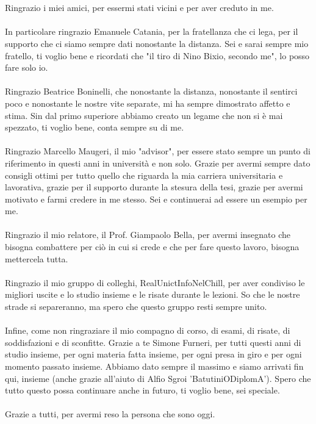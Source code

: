 \\\\Ringrazio i miei amici, per essermi stati vicini e per aver creduto in me.
\\\\In particolare ringrazio Emanuele Catania, per la fratellanza che ci lega, per il supporto che ci siamo sempre dati nonostante la distanza. Sei e sarai sempre mio fratello, ti voglio bene e ricordati che "il tiro di Nino Bixio, secondo me", lo posso fare solo io.
\\\\Ringrazio Beatrice Boninelli, che nonostante la distanza, nonostante il sentirci poco e nonostante le nostre vite separate, mi ha sempre dimostrato affetto e stima. Sin dal primo superiore abbiamo creato un legame che non si è mai spezzato, ti voglio bene, conta sempre su di me.
\\\\Ringrazio Marcello Maugeri, il mio "advisor", per essere stato sempre un punto di riferimento in questi anni in università e non solo. Grazie per avermi sempre dato consigli ottimi per tutto quello che riguarda la mia carriera universitaria e lavorativa, grazie per il supporto durante la stesura della tesi, grazie per avermi motivato e farmi credere in me stesso. Sei e continuerai ad essere un esempio per me.
\\\\Ringrazio il mio relatore, il Prof. Giampaolo Bella, per avermi insegnato che bisogna combattere per ciò in cui si crede e che per fare questo lavoro, bisogna mettercela tutta.
\\\\Ringrazio il mio gruppo di colleghi, RealUnictInfoNelChill, per aver condiviso le migliori uscite e lo studio insieme e le risate durante le lezioni. So che le nostre strade si separeranno, ma spero che questo gruppo resti sempre unito.
\\\\Infine, come non ringraziare il mio compagno di corso, di esami, di risate, di soddisfazioni e di sconfitte. Grazie a te Simone Furneri, per tutti questi anni di studio insieme, per ogni materia fatta insieme, per ogni presa in giro e per ogni momento passato insieme. Abbiamo dato sempre il massimo e siamo arrivati fin qui, insieme (anche grazie all'aiuto di Alfio Sgroi 'BatutiniODiplomA'). Spero che tutto questo possa continuare anche in futuro, ti voglio bene, sei speciale.
\\\\Grazie a tutti, per avermi reso la persona che sono oggi.